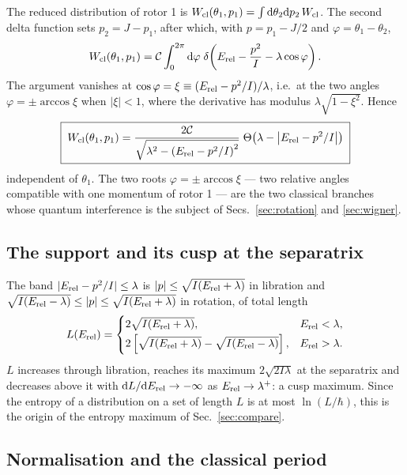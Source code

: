 \documentclass[preprint,12pt]{elsarticle}
\newcommand{\dd}{\mathrm{d}}
\newcommand{\Erel}{E_{\rm rel}}
\begin{document}
The reduced distribution of rotor 1 is $W_{\rm cl}(\theta_{1},p_{1})=\int\dd\theta_{2}
\dd p_{2}\,W_{\rm cl}$. The second delta function sets $p_{2}=J-p_{1}$, after
which, with $p=p_{1}-J/2$ and $\varphi=\theta_{1}-\theta_{2}$,
\begin{equation}
W_{\rm cl}(\theta_{1},p_{1})=\mathcal{C}\int_{0}^{2\pi}\dd\varphi\;
\delta\!\left(\Erel-\frac{p^{2}}{I}-\lambda\cos\varphi\right).
\end{equation}
The argument vanishes at $\cos\varphi=\xi\equiv(\Erel-p^{2}/I)/\lambda$, i.e.\ at
the two angles $\varphi=\pm\arccos\xi$ when $|\xi|<1$, where the derivative has
modulus $\lambda\sqrt{1-\xi^{2}}$. Hence
\begin{equation}
\boxed{\;
W_{\rm cl}(\theta_{1},p_{1})=\frac{2\mathcal{C}}
{\sqrt{\lambda^{2}-\left(\Erel-p^{2}/I\right)^{2}}}\;
\Theta\!\left(\lambda-\left|\Erel-p^{2}/I\right|\right)\;}
\label{eq:Wclass}
\end{equation}
independent of $\theta_{1}$. The two roots $\varphi=\pm\arccos\xi$ --- two
relative angles compatible with one momentum of rotor 1 --- are the two
classical branches whose quantum interference is the subject of
Secs.~\ref{sec:rotation} and \ref{sec:wigner}.

\subsection{The support and its cusp at the separatrix}

The band $|\Erel-p^{2}/I|\le\lambda$ is $|p|\le\sqrt{I(\Erel+\lambda)}$ in
libration and $\sqrt{I(\Erel-\lambda)}\le|p|\le\sqrt{I(\Erel+\lambda)}$ in
rotation, of total length
\begin{equation}
L(\Erel)=\begin{cases}2\sqrt{I(\Erel+\lambda)}, & \Erel<\lambda,\\[2pt]
2\left[\sqrt{I(\Erel+\lambda)}-\sqrt{I(\Erel-\lambda)}\right], & \Erel>\lambda .
\end{cases}
\label{eq:support}
\end{equation}
$L$ increases through libration, reaches its maximum $2\sqrt{2I\lambda}$ at the
separatrix and decreases above it with $\dd L/\dd\Erel\to-\infty$ as
$\Erel\to\lambda^{+}$: a cusp maximum. Since the entropy of a distribution on
a set of length $L$ is at most $\ln(L/\hbar)$, this is the origin of the
entropy maximum of Sec.~\ref{sec:compare}.

\subsection{Normalisation and the classical period}
\end{document}

